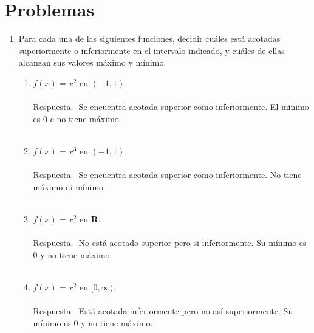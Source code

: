 \section{Problemas}

\begin{enumerate}

\item Para cada una de las siguientes funciones, decidir cuáles está acotadas superiormente o inferiormente en el intervalo indicado, y cuáles de ellas alcanzan sus valores máximo y mínimo.

    \begin{enumerate}[\bfseries (i)]

	\item $f(x) = x^2$ en $(-1,1)$.\\\\
	    Respuesta.-\; Se encuentra acotada superior como inferiormente. El mínimo es $0$ e no tiene máximo.\\\\

	\item $f(x) = x^3$ en  $(-1,1)$.\\\\
	    Respuesta.-\; Se encuentra acotada superior como inferiormente. No tiene máximo ni mínimo\\\\

	\item $f(x) = x^2$ en $\mathbf{R}$.\\\\
	    Respuesta.-\; No está acotado superior pero si inferiormente. Su mínimo es $0$ y no tiene  máximo.\\\\ 

	\item $f(x)=x^2$ en $[0,\infty)$.\\\\
	    Respuesta.-\; Está acotada inferiormente pero no así superiormente. Su mínimo es $0$ y no tiene máximo.\\\\ 


\end{enumerate}
\end{enumerate}
